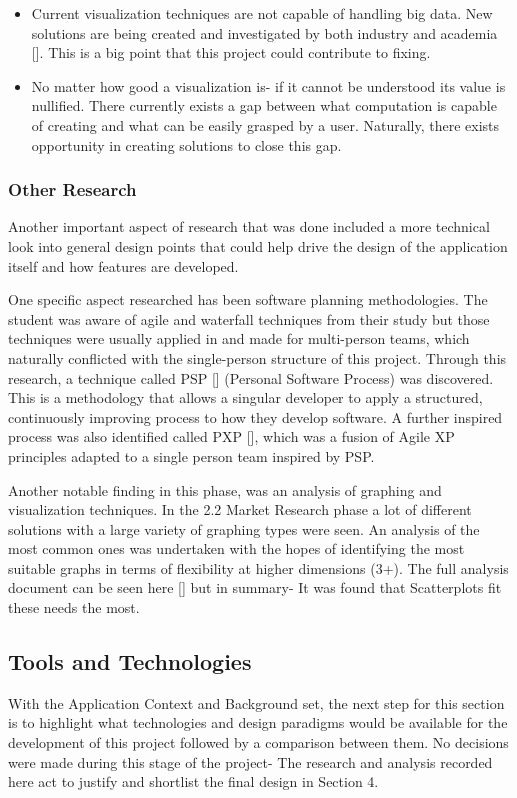 \begin{itemize}
    \item Current visualization techniques are not capable of handling big data. New solutions are being created and investigated by both industry and academia []. This is a big point that this project could contribute to fixing.
    \item No matter how good a visualization is- if it cannot be understood its value is nullified. There currently exists a gap between what computation is capable of creating and what can be easily grasped by a user. Naturally, there exists opportunity in creating solutions to close this gap.
\end{itemize}

\subsubsection{Other Research}
Another important aspect of research that was done included a more technical look into general design points that could help drive the design of the application itself and how features are developed.

One specific aspect researched has been software planning methodologies. The student was aware of agile and waterfall techniques from their study but those techniques were usually applied in and made for multi-person teams, which naturally conflicted with the single-person structure of this project. Through this research, a technique called PSP [] (Personal Software Process) was discovered. This is a methodology that allows a singular developer to apply a structured, continuously improving process to how they develop software. A further inspired process was also identified called PXP [], which was a fusion of Agile XP principles adapted to a single person team inspired by PSP.

Another notable finding in this phase, was an analysis of graphing and visualization techniques. In the 2.2 Market Research phase a lot of different solutions with a large variety of graphing types were seen. An analysis of the most common ones was undertaken with the hopes of identifying the most suitable graphs in terms of flexibility at higher dimensions (3+). The full analysis document can be seen here [] but in summary- It was found that Scatterplots fit these needs the most.

\subsection{Tools and Technologies}
With the Application Context and Background set, the next step for this section is to highlight what technologies and design paradigms would be available for the development of this project followed by a comparison between them. No decisions were made during this stage of the project- The research and analysis recorded here act to justify and shortlist the final design in Section 4.

